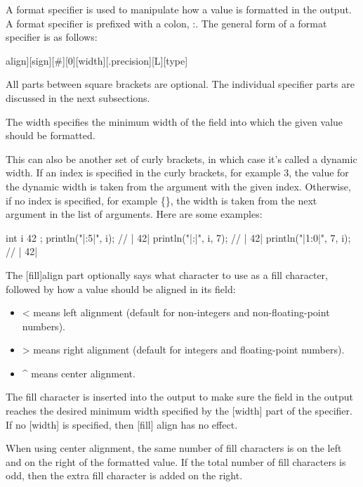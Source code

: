 A format specifier is used to manipulate how a value is formatted in the output. A format specifier is prefixed with a colon, :. The general form of a format specifier is as follows:

\begin{shell}
[[fill]align][sign][#][0][width][.precision][L][type]
\end{shell}

All parts between square brackets are optional. The individual specifier parts are discussed in the next subsections.


The width specifies the minimum width of the field into which the given value should be formatted.

This can also be another set of curly brackets, in which case it’s called a dynamic width. If an index is specified in the curly brackets, for example {3}, the value for the dynamic width is taken from the argument with the given index. Otherwise, if no index is specified, for example \{\}, the width is taken from the next argument in the list of arguments.
Here are some examples:

\begin{cpp}
int i { 42 };
println("|{:5}|", i);        // |    42|
println("|{:{}}|", i, 7);    // |       42|
println("|{1:{0}}|", 7, i);  // |       42|
\end{cpp}



The [fill]align part optionally says what character to use as a fill character, followed by how a value should be aligned in its field:

\begin{itemize}
\item
< means left alignment (default for non-integers and non-floating-point numbers).

\item
> means right alignment (default for integers and floating-point numbers).

\item
\^{}  means center alignment.
\end{itemize}

The fill character is inserted into the output to make sure the field in the output reaches the desired minimum width specified by the [width] part of the specifier. If no [width] is specified, then [fill] align has no effect.

When using center alignment, the same number of fill characters is on the left and on the right of the formatted value. If the total number of fill characters is odd, then the extra fill character is added on the right.

